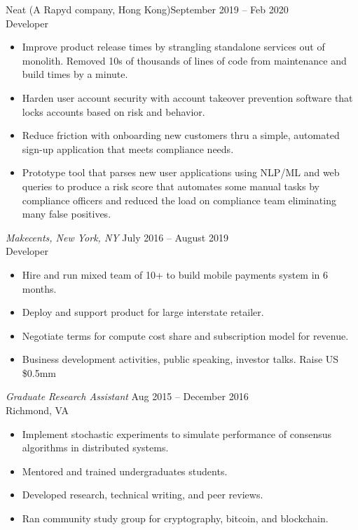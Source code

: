 \documentclass[10pt]{res} %
\begin{document}
\begin{resume}
\vspace{-6pt} %
Neat (A Rapyd company, Hong Kong)\hfill September 2019 -- Feb 2020 \\
Developer
\begin{itemize} 
\item Improve product release times by strangling standalone services out of monolith. Removed 10s of thousands of lines of code from maintenance and build times by a minute.
\item Harden user account security with account takeover prevention software that locks accounts based on risk and behavior.
\item Reduce friction with onboarding new customers thru a simple, automated sign-up application that meets compliance needs.
\item Prototype tool that parses new user applications using NLP/ML and web queries to produce a risk score that automates some manual tasks by compliance officers and reduced the load on compliance team eliminating many false positives.
\end{itemize}
 
{\sl Makecents, New York, NY} \hfill July 2016 -- August 2019 \\
Developer
\begin{itemize}
\item Hire and run mixed team of 10+ to build mobile payments system in 6 months.
\item Deploy and support product for large interstate retailer. 
\item Negotiate terms for compute cost share and subscription model for revenue.
\item Business development activities, public speaking, investor talks. Raise US \$0.5mm
\end{itemize}

{\sl Graduate Research Assistant} \hfill Aug 2015 -- December 2016 \\ Richmond, VA
\begin{itemize} \itemsep -2pt %
\item Implement stochastic experiments to simulate performance of consensus algorithms in distributed systems.
\item Mentored and trained undergraduates students.
\item Developed research, technical writing, and peer reviews.
\item Ran community study group for cryptography, bitcoin, and blockchain.
\end{itemize}


\end{resume}
\end{document}
